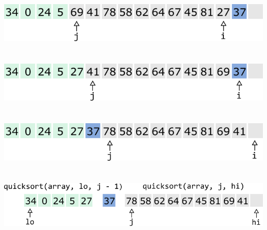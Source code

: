 \documentclass{article}
\begin{document}
\begin{multicols}{2}
\\
\\
\\
\includegraphics[scale=0.53]{../images/qs8.png}
\\
\\
\\
\includegraphics[scale=0.53]{../images/qs9.png}
\\
\\
\\
\includegraphics[scale=0.53]{../images/qs10.png}
\\
\\
\\
\includegraphics[scale=0.47]{../images/qs11.png}
\end{multicols}
\end{document}
